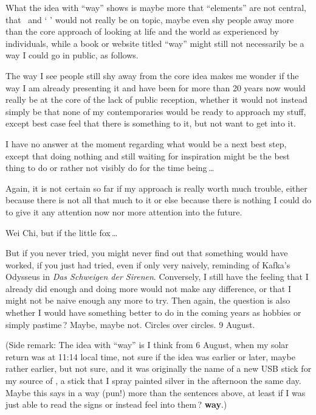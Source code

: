 \begin{itemize}
What the idea with “way” shows is maybe more that “elements” are not central,
that \ELEMENTAL\ and ‘  ’ would not really be on topic,
maybe even shy people away
more than the core approach of looking at life and the world as experienced by individuals,
while a book or website titled “way”
might still not necessarily be a way I could go in public,
as follows.

The way I see people still shy away from the core idea
makes me wonder if the way I am already presenting it
and have been for more than 20 years now
would really be at the core of the lack of public reception,
whether it would not instead simply be
that none of my contemporaries would be ready to approach my stuff,
except best case feel that there is something to it,
but not want to get into it.

I have no answer at the moment regarding what would be a next best step,
except that doing nothing and still waiting for inspiration
might be the best thing to do or rather not visibly do
for the time being\,…

Again,
it is not certain so far if my approach is really worth much trouble,
either because there is not all that much to it
or else because there is nothing I could do to give it any attention now
nor more attention into the future.

Wei Chi, but if the little fox\,…

But if you never tried,
you might never find out that something would have worked,
if you just had tried,
even if only very naively,
reminding of Kafka’s Odysseus in \textsl{Das Schweigen der Sirenen}.
%
Conversely,
I still have the feeling that I already did enough
and doing more would not make any difference,
or that I might not be naive enough any more to try.
%
Then again,
the question is also whether I would have something better to do
in the coming years as hobbies or simply pastime\,?
%
Maybe, maybe not.
%
Circles over circles.
%
9 August.

(Side remark:
The idea with “way” is I think from 6 August,
when my solar return was at 11:14 local time,
not sure if the idea was earlier or later,
maybe rather earlier,
but not sure,
and it was originally the name of a new USB stick
for my source of \ELEMENTAL,
a stick that I spray painted silver
in the afternoon the same day.
%
Maybe this says in a way (pun!)
more than the sentences above,
at least if I was just able to read the signs
or instead feel into them\,?
%
\textbf{way}.)


\end{itemize}
